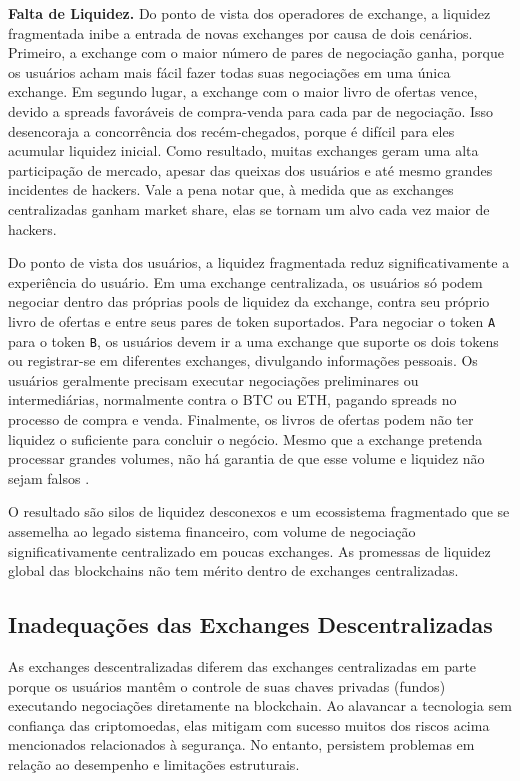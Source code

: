 \documentclass[UTF8,nofonts]{article}
\begin{document}
\begin{multicols}{2}
\textbf{Falta de Liquidez.} Do ponto de vista dos operadores de exchange, a liquidez fragmentada inibe a entrada de novas exchanges por causa de dois cenários. Primeiro, a exchange com o maior número de pares de negociação ganha, porque os usuários acham mais fácil fazer todas suas negociações em uma única exchange. Em segundo lugar, a exchange com o maior livro de ofertas vence, devido a spreads favoráveis de compra-venda para cada par de negociação. Isso desencoraja a concorrência dos recém-chegados, porque é difícil para eles acumular liquidez inicial. Como resultado, muitas exchanges geram uma alta participação de mercado, apesar das queixas dos usuários e até mesmo grandes incidentes de hackers. Vale a pena notar que, à medida que as exchanges centralizadas ganham market share, elas se tornam um alvo cada vez maior de hackers.

Do ponto de vista dos usuários, a liquidez fragmentada reduz significativamente a experiência do usuário. Em uma exchange centralizada, os usuários só podem negociar dentro das próprias pools de liquidez da exchange, contra seu próprio livro de ofertas e entre seus pares de token suportados. Para negociar o token \verb|A| para o token \verb|B|, os usuários devem ir a uma exchange que suporte os dois tokens ou registrar-se em diferentes exchanges, divulgando informações pessoais. Os usuários geralmente precisam executar negociações preliminares ou intermediárias, normalmente contra o BTC ou ETH, pagando spreads no processo de compra e venda. Finalmente, os livros de ofertas podem não ter liquidez o suficiente para concluir o negócio. Mesmo que a exchange pretenda processar grandes volumes, não há garantia de que esse volume e liquidez não sejam falsos \cite{fakevolume}.

O resultado são silos de liquidez desconexos e um ecossistema fragmentado que se assemelha ao legado sistema financeiro, com volume de negociação significativamente centralizado em poucas exchanges. As promessas de liquidez global das blockchains não tem mérito dentro de exchanges centralizadas.

\subsection{Inadequações das Exchanges Descentralizadas}
As exchanges descentralizadas diferem das exchanges centralizadas em parte porque os usuários mantêm o controle de suas chaves privadas (fundos) executando negociações diretamente na blockchain. Ao alavancar a tecnologia sem confiança das criptomoedas, elas mitigam com sucesso muitos dos riscos acima mencionados relacionados à segurança. No entanto, persistem problemas em relação ao desempenho e limitações estruturais. 


\end{multicols}
\end{document}
